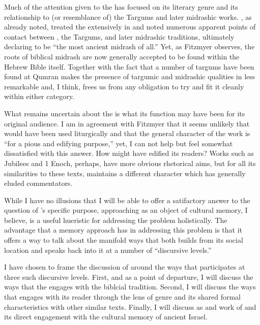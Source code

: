 Much of the attention given to the \ga has focused on its literary genre and its relationship to (or resemblance of) the Targums and later midrashic works. \vermes, as already noted, treated the \ga extensively in  and noted numerous apparent points of contact between \ga, the Targums, and later midrashic traditions, ultimately declaring \ga to be ``the most ancient midrash of all.''\autocite[124]{vermes1961} Yet, as Fitzmyer observes, the roots of biblical midrash are now generally accepted to be found within the Hebrew Bible itself. Together with the fact that a number of targums have been found at Qumran makes the presence of targumic and midrashic qualities in \ga less remarkable and, I think, frees us from any obligation to try and fit it cleanly within either category.\autocite[20]{fitzmyer2004}

What remains uncertain about the \ga is what its function may have been for its original audience. I am in agreement with Fitzmyer that it seems unlikely that \ga would have been used liturgically and that the general character of the work is ``for a pious and edifying purpose,''\autocite[20]{fitzmyer2004} yet, I can not help but feel somewhat dissatisfied with this answer. How might \ga have edified its readers? Works such as Jubilees and 1 Enoch, perhaps, have more obvious rhetorical aims, but for all its similarities to these texts, \ga maintains a different character which has generally eluded commentators.

While I have no illusions that I will be able to offer a satifactory answer to the question of \ga's specific purpose, approaching \ga as an object of cultural memory, I believe, is a useful hueristic for addressing the problem holistically. The advantage that a memory approach has in addressing this problem is that it offers a way to talk about the manifold ways that \ga both builds from its social location and speaks back into it at a number of ``discursive levels.''

I have chosen to frame the discussion of \ga around the ways that \ga participates at three such discursive levels. First, and as a point of departure, I will discuss the ways that the \ga engages with the biblcial tradition. Second, I will discuss the ways that \ga engages with its reader through the lens of genre and its shared formal characteristics with other similar texts. Finally, I will discuss \ga as and work of \psy and its direct engagement with the cultural memory of ancient Israel.

